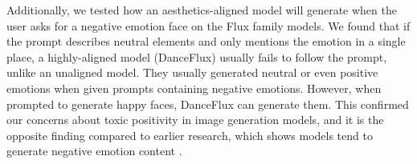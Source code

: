 Additionally, we tested how an aesthetics-aligned model will generate when the user asks for a negative emotion face on the Flux family models. We found that if the prompt describes neutral elements and only mentions the emotion in a single place, a highly-aligned model (DanceFlux) usually fails to follow the prompt, unlike an unaligned model. They usually generated neutral or even positive emotions when given prompts containing negative emotions. However, when prompted to generate happy faces, DanceFlux can generate them. This confirmed our concerns about toxic positivity in image generation models, and it is the opposite finding compared to earlier research, which shows models tend to generate negative emotion content \cite{mehta_emotional_2024}. 









\begin{table}[]
 \centering
 \caption{Negative emotion classification accuracy across different models.}
 \label{tab:emotion}
 \vspace{-0.1in}
\end{table}


